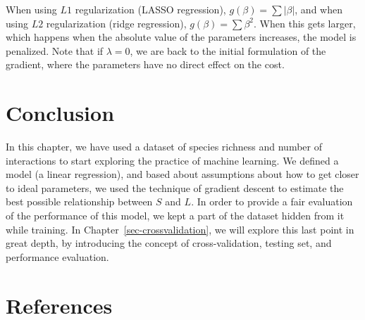 \documentclass[
  letterpaper,
]{scrbook}
\begin{document}
When using \(L1\) regularization (LASSO regression),
\(g(\beta) = \sum |\beta|\), and when using \(L2\) regularization (ridge
regression), \(g(\beta) = \sum \beta^2\). When this gets larger, which
happens when the absolute value of the parameters increases, the model
is penalized. Note that if \(\lambda = 0\), we are back to the initial
formulation of the gradient, where the parameters have no direct effect
on the cost.

\section{Conclusion}\label{conclusion-1}

In this chapter, we have used a dataset of species richness and number
of interactions to start exploring the practice of machine learning. We
defined a model (a linear regression), and based about assumptions about
how to get closer to ideal parameters, we used the technique of gradient
descent to estimate the best possible relationship between \(S\) and
\(L\). In order to provide a fair evaluation of the performance of this
model, we kept a part of the dataset hidden from it while training. In
Chapter~\ref{sec-crossvalidation}, we will explore this last point in
great depth, by introducing the concept of cross-validation, testing
set, and performance evaluation.

\section*{References}\label{bibliography-3}

\end{document}
